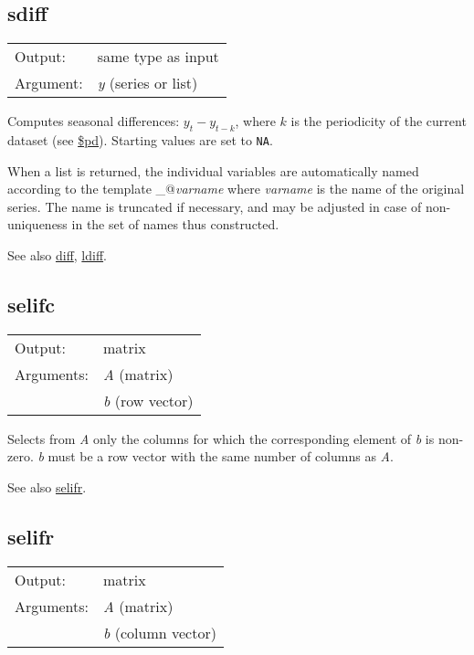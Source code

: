 \subsection{sdiff}
\hypertarget{func-sdiff}{}

\begin{tabular}{ll}
Output:     & same type as input\\
Argument:   & \textsl{y} (series or list)\\
\end{tabular}

	  Computes seasonal differences: $y_t - y_{t-k}$, where
	  \ensuremath{k} is the periodicity of the current dataset (see
	  \hyperlink{func-dolpd}{\$pd}). Starting values are set to
	  \texttt{NA}.

	  When a list is returned, the individual variables are
	  automatically named according to the template
	  \verb@sd_@\textsl{varname} where \textsl{varname} is the
	  name of the original series.  The name is truncated if necessary,
	  and may be adjusted in case of non-uniqueness in the set of names
	  thus constructed.

	  See also \hyperlink{func-diff}{diff}, \hyperlink{func-ldiff}{ldiff}.

\subsection{selifc}
\hypertarget{func-selifc}{}

\begin{tabular}{ll}
Output:     & matrix\\
Arguments:  & \textsl{A} (matrix)\\
           & \textsl{b} (row vector)\\
\end{tabular}

	  Selects from \textsl{A} only the columns for which
	  the corresponding element of \textsl{b} is
	  non-zero. \textsl{b} must be a row vector with
	  the same number of columns as \textsl{A}.

	  See also \hyperlink{func-selifr}{selifr}.

\subsection{selifr}
\hypertarget{func-selifr}{}

\begin{tabular}{ll}
Output:     & matrix\\
Arguments:  & \textsl{A} (matrix)\\
           & \textsl{b} (column vector)\\
\end{tabular}

